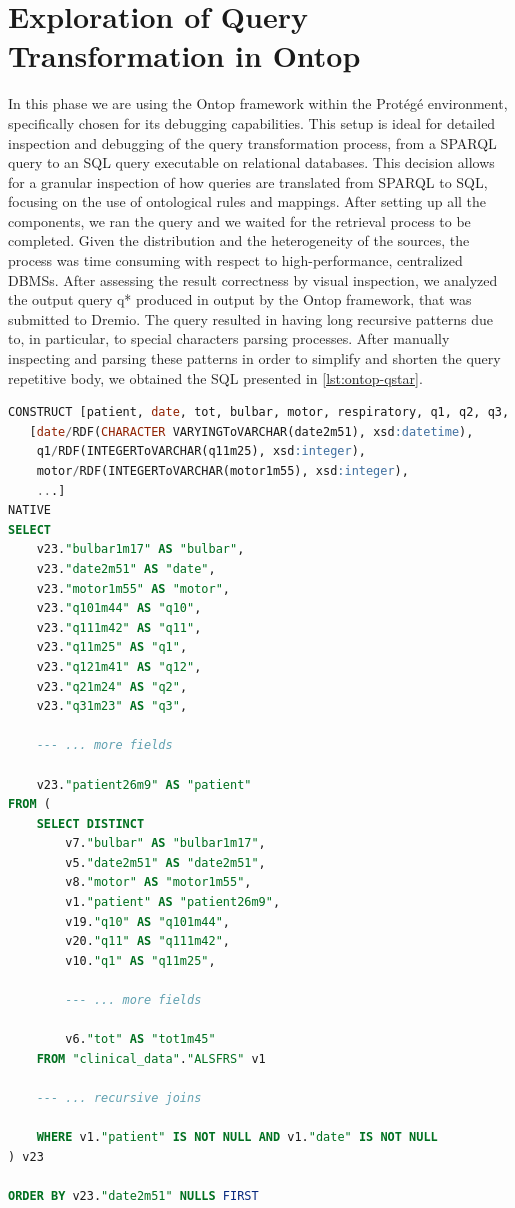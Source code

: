 \section{Exploration of Query Transformation in Ontop}
In this phase we are using the Ontop framework within the Protégé environment, specifically chosen for its debugging capabilities. This setup is ideal for detailed inspection and debugging of the query transformation process, from a SPARQL query to an SQL query executable on relational databases. This decision allows for a granular inspection of how queries are translated from SPARQL to SQL, focusing on the use of ontological rules and mappings. 
After setting up all the components, we ran the query and we waited for the retrieval process to be completed. Given the distribution and the heterogeneity of the sources, the process was time consuming with respect to high-performance, centralized \ac{DBMS}s. After assessing the result correctness by visual inspection, we analyzed the output query q* produced in output by the Ontop framework, that was submitted to Dremio.
The query resulted in having long recursive patterns due to, in particular, to special characters parsing processes.
After manually inspecting and parsing these patterns in order to simplify and shorten the query repetitive body, we obtained the \ac{SQL} presented in \ref{lst:ontop-qstar}.
\begin{lstlisting}[language=SQL, caption={Parsed SQL Translation of the Original SPARQL Query}, label={lst:ontop-qstar}]
CONSTRUCT [patient, date, tot, bulbar, motor, respiratory, q1, q2, q3, q4, q5, q6, q7, q8, q9, q10, q11, q12]
   [date/RDF(CHARACTER VARYINGToVARCHAR(date2m51), xsd:datetime),
    q1/RDF(INTEGERToVARCHAR(q11m25), xsd:integer),
    motor/RDF(INTEGERToVARCHAR(motor1m55), xsd:integer),
    ...]
NATIVE
SELECT
    v23."bulbar1m17" AS "bulbar",
    v23."date2m51" AS "date",
    v23."motor1m55" AS "motor",
    v23."q101m44" AS "q10",
    v23."q111m42" AS "q11",
    v23."q11m25" AS "q1",
    v23."q121m41" AS "q12",
    v23."q21m24" AS "q2",
    v23."q31m23" AS "q3",

    --- ... more fields

    v23."patient26m9" AS "patient"
FROM (
    SELECT DISTINCT
        v7."bulbar" AS "bulbar1m17",
        v5."date2m51" AS "date2m51",
        v8."motor" AS "motor1m55",
        v1."patient" AS "patient26m9",
        v19."q10" AS "q101m44",
        v20."q11" AS "q111m42",
        v10."q1" AS "q11m25",

        --- ... more fields
        
        v6."tot" AS "tot1m45"
    FROM "clinical_data"."ALSFRS" v1
    
    --- ... recursive joins

    WHERE v1."patient" IS NOT NULL AND v1."date" IS NOT NULL
) v23

ORDER BY v23."date2m51" NULLS FIRST
\end{lstlisting}
